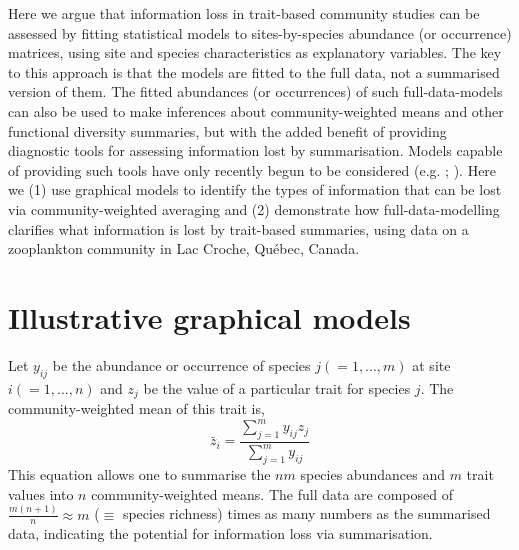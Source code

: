 \documentclass[12pt]{ecology}
\begin{document}
Here we argue that information loss in trait-based community studies can be assessed by fitting statistical models to sites-by-species abundance (or occurrence) matrices, using site and species characteristics as explanatory variables.  The key to this approach is that the models are fitted to the full data, not a summarised version of them.  The fitted abundances (or occurrences) of such full-data-models can also be used to make inferences about community-weighted means and other functional diversity summaries, but with the added benefit of providing diagnostic tools for assessing information lost by summarisation.  Models capable of providing such tools have only recently begun to be considered (e.g. ; ).  Here we (1) use graphical models to identify the types of information that can be lost via community-weighted averaging and (2) demonstrate how full-data-modelling clarifies what information is lost by trait-based summaries, using data on a zooplankton community in Lac Croche, Qu\'{e}bec, Canada.


\section{Illustrative graphical models}
\label{sec:graphmod}

Let $y_{ij}$ be the abundance or occurrence of species $j (= 1, ..., m)$ at site $i (= 1, ..., n)$ and $z_j$ be the value of a particular trait for species $j$.  The community-weighted mean of this trait is, \newpage
\begin{equation} 
\bar{z}_i = \frac{\sum_{j=1}^m y_{ij} z_j}{\sum_{j=1}^m y_{ij}}
\label{eq:cwmdef}
\end{equation}
This equation allows one to summarise the $nm$ species abundances and $m$ trait values into $n$ community-weighted means.  The full data are composed of $\frac{m(n + 1)}{n} \approx m$ ($\equiv$ species richness) times as many numbers as the summarised data, indicating the potential for information loss via summarisation.

\end{document}
